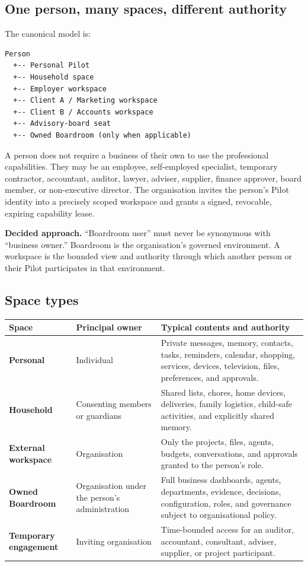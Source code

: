 \documentclass[11pt,a4paper]{article}
\newcommand{\decision}[1]{%
  \par\medskip\noindent
  \colorbox{pilotblue!9}{\parbox{0.94\linewidth}{\textbf{Decided approach.} #1}}%
  \par\medskip}
\begin{document}
\subsection{One person, many spaces, different authority}

The canonical model is:

\begin{lstlisting}[style=pilotcode]
Person
  +-- Personal Pilot
  +-- Household space
  +-- Employer workspace
  +-- Client A / Marketing workspace
  +-- Client B / Accounts workspace
  +-- Advisory-board seat
  +-- Owned Boardroom (only when applicable)
\end{lstlisting}

A person does not require a business of their own to use the professional
capabilities.  They may be an employee, self-employed specialist, temporary
contractor, accountant, auditor, lawyer, adviser, supplier, finance approver,
board member, or non-executive director.  The organisation invites the person's
Pilot identity into a precisely scoped workspace and grants a signed,
revocable, expiring capability lease.

\decision{``Boardroom user'' must never be synonymous with ``business owner.''
Boardroom is the organisation's governed environment.  A workspace is the
bounded view and authority through which another person or their Pilot
participates in that environment.}

\subsection{Space types}

\begin{longtable}{@{}>{\bfseries}p{28mm}p{49mm}p{76mm}@{}}
\toprule
Space & Principal owner & Typical contents and authority \\
\midrule
\endhead
Personal & Individual & Private messages, memory, contacts, tasks, reminders, calendar, shopping, services, devices, television, files, preferences, and approvals. \\
Household & Consenting members or guardians & Shared lists, chores, home devices, deliveries, family logistics, child-safe activities, and explicitly shared memory. \\
External workspace & Organisation & Only the projects, files, agents, budgets, conversations, and approvals granted to the person's role. \\
Owned Boardroom & Organisation under the person's administration & Full business dashboards, agents, departments, evidence, decisions, configuration, roles, and governance subject to organisational policy. \\
Temporary engagement & Inviting organisation & Time-bounded access for an auditor, accountant, consultant, adviser, supplier, or project participant. \\
\bottomrule
\end{longtable}
\end{document}
